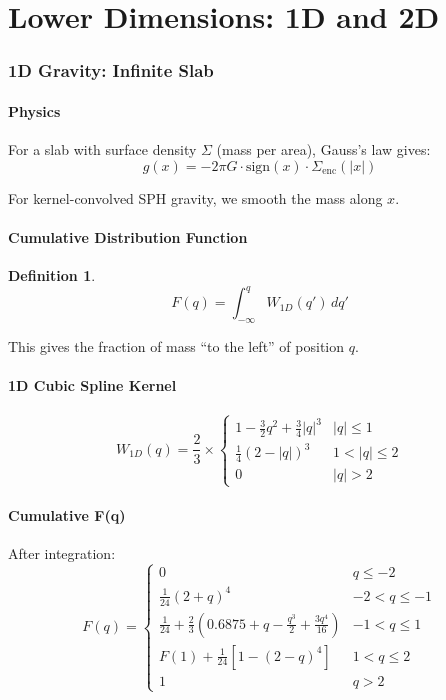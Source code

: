 \documentclass[12pt]{article}
\newtheorem{definition}{Definition}
\begin{document}
\part{Lower Dimensions: 1D and 2D}

\section{1D Gravity: Infinite Slab}

\subsection{Physics}
For a slab with surface density $\Sigma$ (mass per area), Gauss's law gives:
\begin{equation}
g(x) = -2\pi G \cdot \text{sign}(x) \cdot \Sigma_{\text{enc}}(|x|)
\end{equation}

For kernel-convolved SPH gravity, we smooth the mass along $x$.

\subsection{Cumulative Distribution Function}
\begin{definition}
\begin{equation}
F(q) = \int_{-\infty}^{q} W_{1D}(q') \, dq'
\end{equation}
\end{definition}

This gives the fraction of mass ``to the left'' of position $q$.

\subsection{1D Cubic Spline Kernel}
\begin{equation}
W_{1D}(q) = \frac{2}{3} \times
\begin{cases}
1 - \frac{3}{2}q^2 + \frac{3}{4}|q|^3 & |q| \leq 1 \\[4pt]
\frac{1}{4}(2-|q|)^3 & 1 < |q| \leq 2 \\[4pt]
0 & |q| > 2
\end{cases}
\end{equation}

\subsection{Cumulative F(q)}
After integration:
\begin{equation}
F(q) =
\begin{cases}
0 & q \leq -2 \\[4pt]
\frac{1}{24}(2+q)^4 & -2 < q \leq -1 \\[4pt]
\frac{1}{24} + \frac{2}{3}\left(0.6875 + q - \frac{q^3}{2} + \frac{3q^4}{16}\right) & -1 < q \leq 1 \\[4pt]
F(1) + \frac{1}{24}\left[1 - (2-q)^4\right] & 1 < q \leq 2 \\[4pt]
1 & q > 2
\end{cases}
\end{equation}
\end{document}

